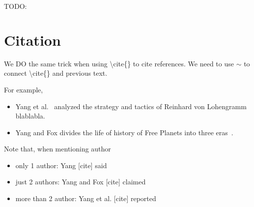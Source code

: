 TODO:


\section{Citation}
\label{sec:citation}

We DO the same trick when using \textbackslash cite\{\} to cite references. We need to use $\sim$ to connect \textbackslash cite\{\} and previous text.

For example,
\begin{itemize}
\item Yang et al.~\cite{Yang_2016} analyzed the strategy and tactics of Reinhard von Lohengramm blablabla.
\item Yang and Fox divides the life of history of Free Planets into three eras~\cite{Yang_2017}.
\end{itemize}

Note that, when mentioning author~\cite{Mirkovic_2010}
\begin{itemize}
\item only 1 author: Yang [cite] said
\item just 2 authors: Yang and Fox [cite] claimed
\item more than 2 author: Yang et al. [cite] reported
\end{itemize}